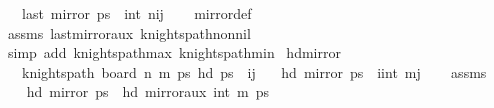 \begin{isabellebody}
\ \ \ {\isachardoublequoteopen}last\ {\isacharparenleft}{\kern0pt}mirror{}\ ps{\isacharparenright}{\kern0pt}\ {\isacharequal}{\kern0pt}\ {\isacharparenleft}{\kern0pt}int\ n{\isacharplus}{\kern0pt}{}{\isacharminus}{\kern0pt}i{\isacharcomma}{\kern0pt}j{\isacharparenright}{\kern0pt}{\isachardoublequoteclose}\isanewline
%
\isadelimproof
\ \ %
\endisadelimproof
%
\isatagproof
{}\isamarkupfalse%
\ mirror{}{\isacharunderscore}{\kern0pt}def\ \isamarkupfalse%
\ assms\ last{\isacharunderscore}{\kern0pt}mirror{}{\isacharunderscore}{\kern0pt}aux\ knights{\isacharunderscore}{\kern0pt}path{\isacharunderscore}{\kern0pt}non{\isacharunderscore}{\kern0pt}nil\isanewline
\ \ \isamarkupfalse%
\ {\isacharparenleft}{\kern0pt}simp\ add{\isacharcolon}{\kern0pt}\ knights{\isacharunderscore}{\kern0pt}path{\isacharunderscore}{\kern0pt}max{}\ knights{\isacharunderscore}{\kern0pt}path{\isacharunderscore}{\kern0pt}min{}{\isacharparenright}{\kern0pt}%
\endisatagproof
{\isafoldproof}%
%
\isadelimproof
\isanewline
%
\endisadelimproof
\isanewline
{}\isamarkupfalse%
\ hd{\isacharunderscore}{\kern0pt}mirror{}{\isacharcolon}{\kern0pt}\isanewline
\ \ \ {\isachardoublequoteopen}knights{\isacharunderscore}{\kern0pt}path\ {\isacharparenleft}{\kern0pt}board\ n\ m{\isacharparenright}{\kern0pt}\ ps{\isachardoublequoteclose}\ {\isachardoublequoteopen}hd\ ps\ {\isacharequal}{\kern0pt}\ {\isacharparenleft}{\kern0pt}i{\isacharcomma}{\kern0pt}j{\isacharparenright}{\kern0pt}{\isachardoublequoteclose}\isanewline
\ \ \ {\isachardoublequoteopen}hd\ {\isacharparenleft}{\kern0pt}mirror{}\ ps{\isacharparenright}{\kern0pt}\ {\isacharequal}{\kern0pt}\ {\isacharparenleft}{\kern0pt}i{\isacharcomma}{\kern0pt}int\ m{\isacharplus}{\kern0pt}{}{\isacharminus}{\kern0pt}j{\isacharparenright}{\kern0pt}{\isachardoublequoteclose}\isanewline
%
\isadelimproof
\ \ %
\endisadelimproof
%
\isatagproof
{}\isamarkupfalse%
\ assms\isanewline
{}\isamarkupfalse%
\ {\isacharminus}{\kern0pt}\isanewline
\ \ \isamarkupfalse%
\ {\isachardoublequoteopen}hd\ {\isacharparenleft}{\kern0pt}mirror{}\ ps{\isacharparenright}{\kern0pt}\ {\isacharequal}{\kern0pt}\ hd\ {\isacharparenleft}{\kern0pt}mirror{}{\isacharunderscore}{\kern0pt}aux\ {\isacharparenleft}{\kern0pt}int\ m{\isacharplus}{\kern0pt}{}{\isacharparenright}{\kern0pt}\ ps{\isacharparenright}{\kern0pt}{\isachardoublequoteclose}\isanewline

\end{isabellebody}
